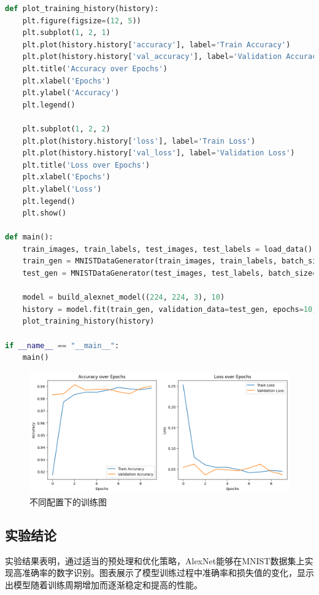\documentclass[a4paper,12pt]{article}
\begin{document}
\begin{lstlisting}[language=Python]
def plot_training_history(history):
	plt.figure(figsize=(12, 5))
	plt.subplot(1, 2, 1)
	plt.plot(history.history['accuracy'], label='Train Accuracy')
	plt.plot(history.history['val_accuracy'], label='Validation Accuracy')
	plt.title('Accuracy over Epochs')
	plt.xlabel('Epochs')
	plt.ylabel('Accuracy')
	plt.legend()

	plt.subplot(1, 2, 2)
	plt.plot(history.history['loss'], label='Train Loss')
	plt.plot(history.history['val_loss'], label='Validation Loss')
	plt.title('Loss over Epochs')
	plt.xlabel('Epochs')
	plt.ylabel('Loss')
	plt.legend()
	plt.show()

def main():
	train_images, train_labels, test_images, test_labels = load_data()
	train_gen = MNISTDataGenerator(train_images, train_labels, batch_size=64)
	test_gen = MNISTDataGenerator(test_images, test_labels, batch_size=64)

	model = build_alexnet_model((224, 224, 3), 10)
	history = model.fit(train_gen, validation_data=test_gen, epochs=10, verbose=2)
	plot_training_history(history)

if __name__ == "__main__":
	main()
\end{lstlisting}

\begin{figure}[htbp]
	\centering
	\includegraphics[width=1\textwidth]{20.png}
	\caption{不同配置下的训练图}
\end{figure}





\subsection{实验结论}
实验结果表明，通过适当的预处理和优化策略，AlexNet能够在MNIST数据集上实现高准确率的数字识别。图表展示了模型训练过程中准确率和损失值的变化，显示出模型随着训练周期增加而逐渐稳定和提高的性能。
\end{document}
